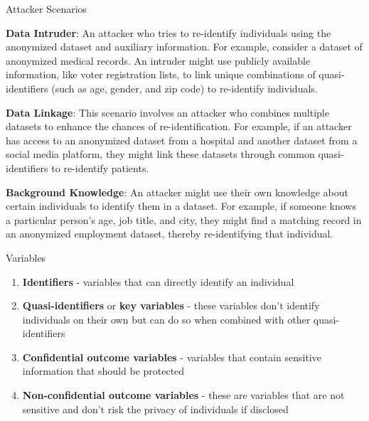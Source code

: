 \documentclass[
	aspectratio = 169
 ]{beamer}
\begin{document}
\begin{frame}{Attacker Scenarios}

\textbf{Data Intruder}: An attacker who tries to re-identify individuals
using the anonymized dataset and auxiliary information. For example,
consider a dataset of anonymized medical records. An intruder might use
publicly available information, like voter registration lists, to link
unique combinations of quasi-identifiers (such as age, gender, and zip
code) to re-identify individuals.

\textbf{Data Linkage}: This scenario involves an attacker who combines
multiple datasets to enhance the chances of re-identification. For
example, if an attacker has access to an anonymized dataset from a
hospital and another dataset from a social media platform, they might
link these datasets through common quasi-identifiers to re-identify
patients.

\textbf{Background Knowledge}: An attacker might use their own knowledge
about certain individuals to identify them in a dataset. For example, if
someone knows a particular person's age, job title, and city, they might
find a matching record in an anonymized employment dataset, thereby
re-identifying that individual.
\end{frame}

\begin{frame}{Variables}

\begin{enumerate}
\item
  \textbf{Identifiers} - variables that can directly identify an
  individual
\item
  \textbf{Quasi-identifiers} or \textbf{key variables} - these variables
  don't identify individuals on their own but can do so when combined
  with other quasi-identifiers
\item
  \textbf{Confidential outcome variables} - variables that contain
  sensitive information that should be protected
\item
  \textbf{Non-confidential outcome variables} - these are variables that
  are not sensitive and don't risk the privacy of individuals if
  disclosed
\end{enumerate}
\end{frame}
\end{document}
